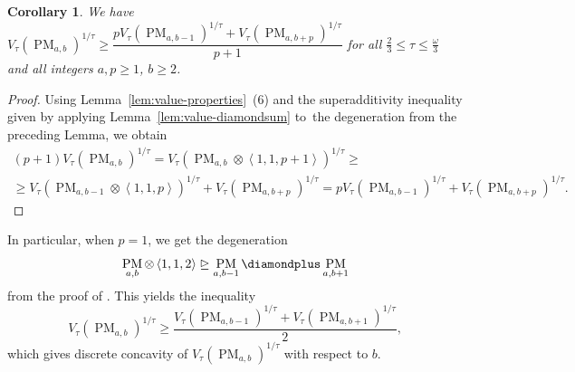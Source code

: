 \documentclass[11pt,letterpaper]{article}
\newtheorem{corollary}[theorem]{Corollary}\AddToHook{env/corollary/begin}{\crefalias{theorem}{corollary}}
\numberwithin{equation}{section}
\DeclareMathOperator{\PM}{PM}
\begin{document}
\begin{corollary}\label{cor:pm-concavity}
    We have $V_\tau(\PM_{a, b})^{1/\tau} \geq \dfrac{p V_\tau(\PM_{a, b - 1})^{1/\tau} + V_\tau(\PM_{a, b + p})^{1/\tau}}{p + 1}$ for all $\frac23 \leq \tau \leq \frac{\omega}{3}$ and all integers $a, p \geq 1$, $b \geq 2$.
\end{corollary}
\begin{proof}
  Using Lemma~\ref{lem:value-properties}~(6) and the superadditivity inequality given by applying Lemma~\ref{lem:value-diamondsum} to~the degeneration from the preceding Lemma, we obtain
  \begin{multline*}
    (p + 1) V_\tau(\PM_{a, b})^{1/\tau} = V_\tau(\PM_{a, b} \otimes \left<1,1,p + 1\right>)^{1/\tau} \geq\\\geq V_\tau(\PM_{a, b - 1} \otimes \left<1,1,p\right>)^{1/\tau} + V_\tau(\PM_{a, b + p})^{1/\tau} = p V_\tau(\PM_{a, b - 1})^{1/\tau} + V_\tau(\PM_{a, b + p})^{1/\tau}.
  \end{multline*}
\end{proof}

In particular, when $p = 1$, we get the degeneration \[
\PM_{a, b} \otimes \left<1,1,2\right> \trianglerighteq \PM_{a, b - 1} \diamondplus \PM_{a, b + 1}
\]
from the proof of \cite[Lemma~4.1]{chatgpt-paper}.
This yields the inequality \[
V_\tau(\PM_{a, b})^{1/\tau} \geq \dfrac{V_\tau(\PM_{a, b - 1})^{1/\tau} + V_\tau(\PM_{a, b + 1})^{1/\tau}}{2},
\] which gives discrete concavity of $V_\tau(\PM_{a, b})^{1/\tau}$ with respect to $b$.
\end{document}
